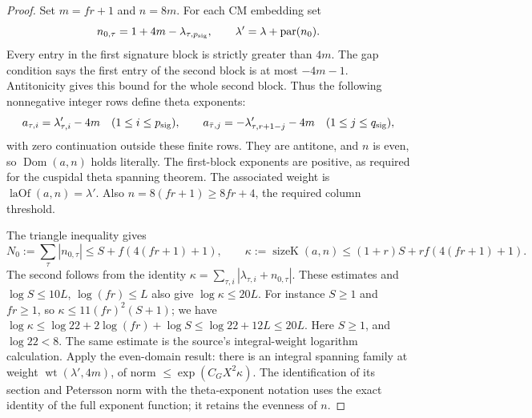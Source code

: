 \begin{proof}
Set \(m=fr+1\) and \(n=8m\).
For each CM embedding set
\[
       n_{0,\tau}=1+4m-\lambda_{\tau,p_{\rm sig}},\qquad
       \lambda'=\lambda+\operatorname{par}(n_0).
\]
Every entry in the first signature block is strictly greater
than \(4m\).
The gap condition says the first entry of the second block is
at most \(-4m-1\).
Antitonicity gives this bound for the whole second block.
Thus the following nonnegative integer rows define theta
exponents:
\[
 a_{\tau,i}=\lambda'_{\tau,i}-4m
                    \quad(1\le i\le p_{\rm sig}),\qquad
 a_{\bar\tau,j}=-\lambda'_{\tau,r+1-j}-4m
                    \quad(1\le j\le q_{\rm sig}),
\]
with zero continuation outside these finite rows.
They are antitone, and \(n\) is even, so
\(\operatorname{Dom}(a,n)\) holds literally.
The first-block exponents are positive, as required for the
cuspidal theta spanning theorem.
The associated weight is \(\operatorname{laOf}(a,n)=\lambda'\).
Also \(n=8(fr+1)\ge8fr+4\), the required column threshold.

The triangle inequality gives
\[
 N_0:=\sum_\tau|n_{0,\tau}|
                    \le S+f(4(fr+1)+1),\qquad
 \kappa:=\operatorname{sizeK}(a,n)
                    \le(1+r)S+rf(4(fr+1)+1).
\]
The second follows from the identity
\(\kappa=\sum_{\tau,i}|\lambda_{\tau,i}+n_{0,\tau}|\).
These estimates and \(\log S\le10L\), \(\log(fr)\le L\)
also give \(\log\kappa\le20L\).
For instance \(S\ge1\) and \(fr\ge1\), so
\(\kappa\le 11(fr)^2(S+1)\);
we have
\(\log\kappa\le\log22+2\log(fr)+\log S
               \le\log22+12L\le20L\).
Here \(S\ge1\), and \(\log22<8\).
The same estimate is the source's integral-weight logarithm
calculation.
Apply the even-domain result: there is an integral spanning
family at weight
\(\operatorname{wt}(\lambda',4m)\), of norm
\(\le\exp(C_GX^2\kappa)\).
The identification of its section and Petersson norm with
the theta-exponent notation uses the exact identity of the full
exponent function; it retains the evenness of \(n\).


\end{proof}
